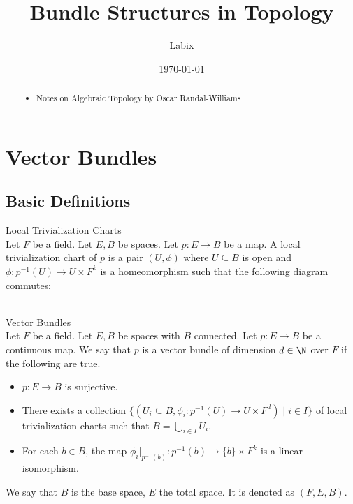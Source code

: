 \documentclass[a4paper]{article}
\title{Bundle Structures in Topology}
\author{Labix}
\date{\today}
\begin{document}
\maketitle
\begin{abstract}
\begin{itemize}
\item Notes on Algebraic Topology by Oscar Randal-Williams
\end{itemize}
\end{abstract}
\pagebreak
\tableofcontents

\pagebreak
\section{Vector Bundles}
\subsection{Basic Definitions}
\begin{defn}{Local Trivialization Charts}{}\\
Let $F$ be a field. Let $E,B$ be spaces. Let $p:E\to B$ be a map. A local trivialization chart of $p$ is a pair $(U,\phi)$ where $U\subseteq B$ is open and $\phi:p^{-1}(U)\to U\times F^k$ is a homeomorphism such that the following diagram commutes: \\
\\
\end{defn}

\begin{defn}{Vector Bundles}{}\\
Let $F$ be a field. Let $E,B$ be spaces with $B$ connected. Let $p:E\to B$ be a continuous map. We say that $p$ is a vector bundle of dimension $d\in\N$ over $F$ if the following are true. 
\begin{itemize}
\item $p:E\to B$ is surjective. 
\item There exists a collection $\{(U_i\subseteq B,\phi_i:p^{-1}(U)\to U\times F^d)\;|\;i\in I\}$ of local trivialization charts such that $B=\bigcup_{i\in I}U_i$. 
\item For each $b\in B$, the map $\phi_i|_{p^{-1}(b)}:p^{-1}(b)\to\{b\}\times F^k$ is a linear isomorphism. 
\end{itemize}
We say that $B$ is the base space, $E$ the total space. It is denoted as $(F,E,B)$. 
\end{defn}
\end{document}
